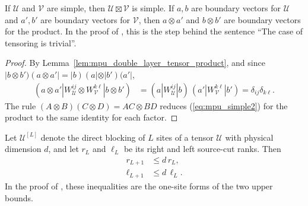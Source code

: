 \begin{lemma}
    \label{thm:mpu_simple_tensor_product}
    \leanok
    If $\mathcal U$ and $\mathcal V$ are simple, then
    $\mathcal U\boxtimes\mathcal V$ is simple. If $a,b$ are boundary vectors for
    $\mathcal U$ and $a',b'$ are boundary vectors for $\mathcal V$, then
    $a\otimes a'$ and $b\otimes b'$ are boundary vectors for the product. In the proof of \cite[Theorem~IV.6(ii)]{Cirac2017MPU}, this is
    the step behind the sentence ``The case of tensoring is
    trivial''.
\end{lemma}

\begin{proof}\leanok
    By Lemma~\ref{lem:mpu_double_layer_tensor_product}, and since
    $|b\otimes b')(a\otimes a'|=|b)(a|\otimes|b')(a'|$,
    \begin{align}
        (a\otimes a'|W_{\mathcal U}^{ij}\otimes W_{\mathcal V}^{k\ell}
        |b\otimes b')
         & =(a|W_{\mathcal U}^{ij}|b)\,(a'|W_{\mathcal V}^{k\ell}|b')
        =\delta_{ij}\delta_{k\ell}.
    \end{align}
    The rule $(A\otimes B)(C\otimes D)=AC\otimes BD$ reduces
    (\ref{eq:mpu_simple2}) for the product to the same identity for each
    factor.
\end{proof}

\begin{lemma}
    \label{thm:mpu_source_cut_rank_blocking_succ}
    \leanok
    Let $\mathcal U^{[L]}$ denote the direct blocking of $L$ sites of a tensor
    $\mathcal U$ with physical dimension $d$, and let $r_L$ and $\ell_L$ be
    its right and left source-cut ranks. Then
    \begin{align}
        r_{L+1}    & \leq d\,r_L,    \\
        \ell_{L+1} & \leq d\,\ell_L.
    \end{align}
    In the proof of \cite[Proposition~IV.2]{Cirac2017MPU}, these inequalities are the one-site forms of the two upper
    bounds.
\end{lemma}

